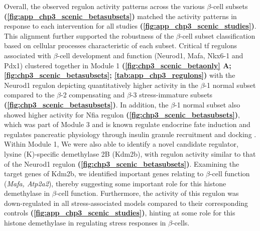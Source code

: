 
\par Overall, the observed regulon activity patterns across the various $\beta$-cell subsets \textbf{(\autoref{fig:app_chp3_scenic_betasubsets})} matched the activity patterns in response to each intervention for all studies \textbf{(\autoref{fig:app_chp3_scenic_studies})}. This alignment further supported the robustness of the $\beta$-cell subset classification based on cellular processes characteristic of each subset. Critical \gls{tf} regulons associated with $\beta$-cell development and function (Neurod1, Mafa, Nkx6-1 and Pdx1) clustered together in Module 1 \textbf{(\autoref{fig:chp3_scenic_betaonly} A; \autoref{fig:chp3_scenic_betasubsets}; \autoref{tab:app_chp3_regulons})} with the Neurod1 regulon depicting quantitatively higher activity in the $\beta$-1 normal subset compared to the $\beta$-2 compensating and $\beta$-3 stress-immature subsets \textbf{(\autoref{fig:chp3_scenic_betasubsets})}. In addition, the $\beta$-1 normal subset also showed higher activity for Nfia regulon \textbf{(\autoref{fig:chp3_scenic_betasubsets})}, which was part of Module 3 and is known regulate endocrine fate induction \textbf{\cite{scavuzzo_pancreatic_2018}} and regulates pancreatic physiology through insulin granule recruitment and docking \textbf{\cite{scavuzzo_nfia_2019}}. Within Module 1, We were also able to identify a novel candidate regulator, lysine (K)-specific demethylase 2B (Kdm2b), with regulon activity similar to that of the Neurod1 regulon \textbf{(\autoref{fig:chp3_scenic_betasubsets})}. Examining the target genes of Kdm2b, we identified important genes relating to  $\beta$-cell function (\textit{Mafa, Atp2a2}), thereby suggesting some important role for this histone demethylase in $\beta$-cell function. Furthermore, the activity of this regulon was down-regulated in all stress-associated models compared to their corresponding controls \textbf{(\autoref{fig:app_chp3_scenic_studies})}, hinting at some role for this histone demethylase in regulating stress responses in $\beta$-cells.\\


